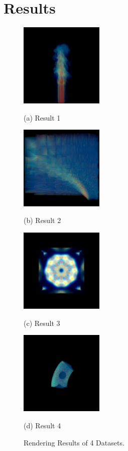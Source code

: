 \documentclass[acmtog]{acmart}
\begin{document}
\section{Results}
\begin{figure}
\begin{minipage}{0.48\linewidth}
	\centerline{\includegraphics[width=4cm]{figure/tetra_vol_1sample}}
	\centerline{(a) Result 1}
\end{minipage}
\hfill
\begin{minipage}{0.48\linewidth}
	\centerline{\includegraphics[width=4cm]{figure/blunt06jet}}
	\centerline{(b) Result 2}
\end{minipage}
\vfill
\begin{minipage}{0.48\linewidth}
	\centerline{\includegraphics[width=4cm]{figure/bucky_jet}}
	\centerline{(c) Result 3}
\end{minipage}
\hfill
\begin{minipage}{0.48\linewidth}
	\centerline{\includegraphics[width=4cm]{figure/spx_005_jet}}
	\centerline{(d) Result 4}
\end{minipage}
\caption{Rendering Results of 4 Datasets.}
\end{figure}
\end{document}
